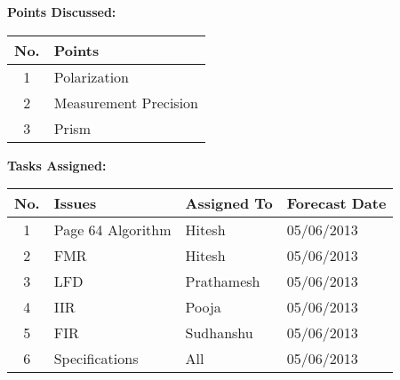 \documentclass[a4paper,12pt]{article}
\begin{document}
\pagebreak

\textbf{Points Discussed:}
\vskip10pt
\begin{tabular}{|c|p{13cm}|}
 \hline
 \textbf{No.} & \textbf{Points} \\
  \hline
  \hline
1 & Polarization \\
  \hline
2 & Measurement Precision \\
  \hline
3 & Prism \\
  \hline
\end{tabular}

\vskip20pt

\textbf{Tasks Assigned:}
\vskip10pt
\begin{tabular}{|c|p{6cm}|p{3cm}|p{4cm}|}
 \hline
 \hline
 \textbf{No.} & \textbf{Issues} & \textbf{Assigned To} & \textbf{Forecast Date} \\
  \hline
  \hline
1 & Page 64 Algorithm & Hitesh & 05/06/2013 \\
  \hline
2 & FMR & Hitesh & 05/06/2013 \\
  \hline
3 & LFD & Prathamesh & 05/06/2013 \\
  \hline
4 & IIR & Pooja & 05/06/2013 \\
  \hline
5 & FIR & Sudhanshu & 05/06/2013 \\
  \hline
6 & Specifications & All & 05/06/2013 \\
  \hline
\end{tabular}
\end{document}

